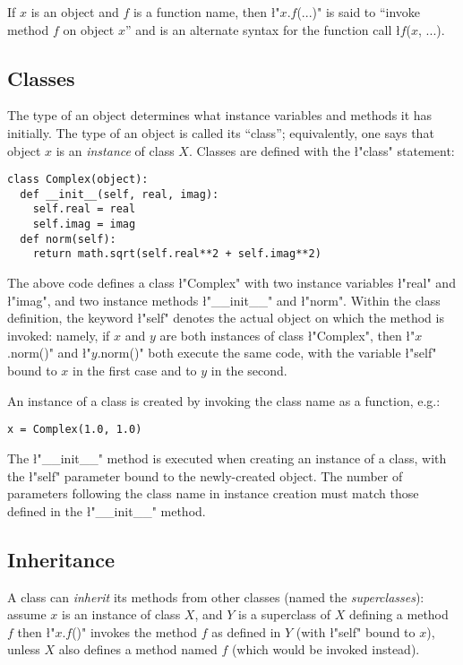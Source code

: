 If $x$ is an object and $f$ is a function name, then
\l"$x$.$f$($...$)" is said to ``invoke method $f$ on object $x$''
and is an alternate syntax for the function call \l{$f$($x$, $...$)}.

\subsection{Classes}
\label{sec:classes}

The type of an object determines what instance variables and methods
it has initially.  The type of an object is called its ``class'';
equivalently, one says that object $x$ is an \emph{instance} of class
$X$.  Classes are defined with the \l"class" statement:
\begin{lstlisting}
class Complex(object):
  def __init__(self, real, imag):
    self.real = real
    self.imag = imag
  def norm(self):
    return math.sqrt(self.real**2 + self.imag**2)
\end{lstlisting}
The above code defines a class \l"Complex" with two instance variables
\l"real" and \l"imag", and two instance methods \l"__init__" and
\l"norm".  Within the class definition, the keyword \l"self" denotes
the actual object on which the method is invoked: namely, if $x$ and
$y$ are both instances of class \l"Complex", then \l"$x$.norm()" and
\l"$y$.norm()" both execute the same code, with the variable \l"self"
bound to $x$ in the first case and to $y$ in the second. 

An instance of a class is created by invoking the class name as a
function, e.g.:
\begin{lstlisting}
x = Complex(1.0, 1.0)
\end{lstlisting}
The \l"__init__" method is executed when creating an instance of a
class, with the \l"self" parameter bound to the newly-created object.
The number of parameters following the class name in instance creation
must match those defined in the \l"__init__" method.

\subsection{Inheritance}
\label{sec:inheritance}

A class can \emph{inherit} its methods from other classes (named the
\emph{superclasses}): assume $x$ is an instance of class $X$, and $Y$ is a
superclass of $X$ defining a method $f$ then \l"$x$.$f$()" invokes the
method $f$ as defined in $Y$ (with \l"self" bound to $x$), unless $X$
also defines a method named $f$ (which would be invoked instead).

